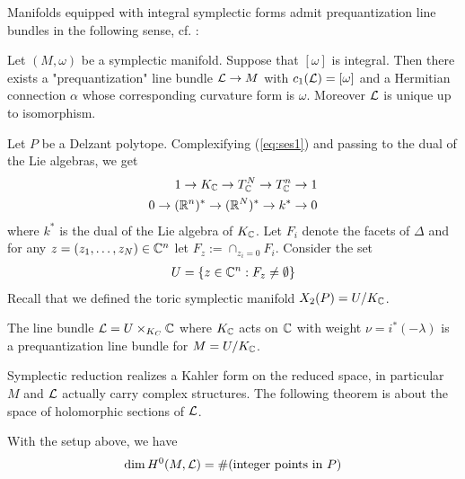 Manifolds equipped with integral symplectic forms admit prequantization line bundles in the following sense, cf. \cite{lsg}:

\begin{theorem}
    Let $(M,\omega)$ be a symplectic manifold. Suppose that $[\omega]$ is integral. Then 
    there exists a "prequantization" line bundle ${\mathcal{L}} \to M$ with $c_1({\mathcal{L}}) = [\omega]$ and a Hermitian connection $\alpha$
    whose corresponding curvature form is $\omega$. Moreover ${\mathcal{L}}$ is unique up to isomorphism.
\end{theorem}

Let $P$ be a Delzant polytope. Complexifying (\ref{eq:ses1}) and passing to the dual of the Lie algebras, we get \begin{align*}
    1\to K_{\mathbb{C}} \to T_{\mathbb{C}}^N \to T_{\mathbb{C}}^n \to 1 \\
    0 \to (\mathbb{R}^n)^* \to (\mathbb{R}^N)^* \to k^* \to 0
\end{align*} where $k^*$ is the dual of the Lie algebra of $K_{\mathbb{C}}$. 
Let $F_i$ denote the facets of $\Delta$ and for any $z = (z_1,\dots,z_N)\in\mathbb{C}^n$ let $F_z := \cap_{z_i = 0}F_i$.
Consider the set \begin{align*}
    U = \{z\in\mathbb{C}^n: F_z \neq \emptyset\}
\end{align*} Recall that we defined the toric symplectic manifold $X_2(P) = U/K_{\mathbb{C}}$.

\begin{proposition}
    The line bundle ${\mathcal{L}} = U \times_{K_C} \mathbb{C}$ where $K_{\mathbb{C}}$ acts on $\mathbb{C}$ with 
    weight $\nu = i^*(-\lambda)$ is a prequantization line bundle for $M = U/K_{\mathbb{C}}$. 
\end{proposition}

Symplectic reduction realizes a Kahler form on the reduced space, in particular
$M$ and ${\mathcal{L}}$ actually carry complex structures. The following theorem is about the space of
holomorphic sections of ${\mathcal{L}}$.
\begin{theorem}
    With the setup above, we have \begin{align*}
        \dim H^0(M,{\mathcal{L}}) = \#(\text{integer points in } P)
    \end{align*}
\end{theorem}

